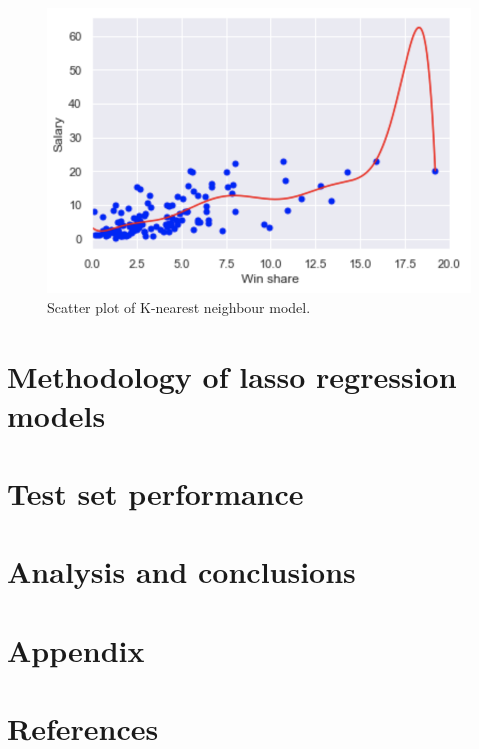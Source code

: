 \documentclass[letterpaper,12pt,twoside,]{pinp}
\begin{document}
\begin{figure}
\includegraphics[width=0.8\linewidth]{poly_plot.png}
\centering
\caption{Scatter plot of K-nearest neighbour model.}
\label{fig:knn}
\end{figure}

\hypertarget{methodology-of-lasso-regression-models}{%
\section{Methodology of lasso regression
models}\label{methodology-of-lasso-regression-models}}

\hypertarget{test-set-performance}{%
\section{Test set performance}\label{test-set-performance}}

\hypertarget{analysis-and-conclusions}{%
\section{Analysis and conclusions}\label{analysis-and-conclusions}}

\hypertarget{appendix}{%
\section{Appendix}\label{appendix}}

\hypertarget{references}{%
\section{References}\label{references}}
\end{document}
